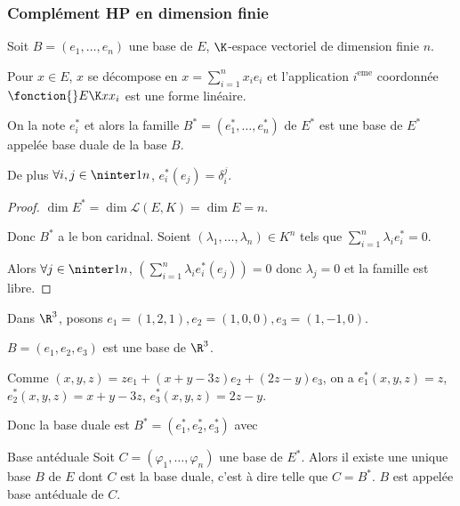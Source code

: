 \subsubsection{Complément HP en dimension finie}

\begin{definition}{}{}

    Soit $B = (e_1, \dots, e_n)$ une base de $E$, $\K$-espace vectoriel de dimension finie $n$. 

    Pour $x\in E$, $x$ se décompose en $x = \sum_{i=1}^n x_i e_i$ et l'application $i^{\text{eme}}$ coordonnée
    $\fonction{} E \K x {x_i}$ est une forme linéaire. 

    On la note $e_i^*$ et alors la famille $B^* = (e_1^*, \dots, e_n^*)$ de $E^*$ est une base de $E^*$
    appelée base duale de la base $B$.

    De plus $\forall i, j \in \ninter 1 n$, $e_i^*(e_j) = \delta_i^j$.
\end{definition}

\begin{proof}
    $\dim E^* = \dim \mathscr L (E, K) = \dim E = n$. 

    Donc $B^*$ a le bon caridnal. Soient $(\lambda_1, \dots, \lambda_n) \in K^n$ tels que
    $\sum_{i=1}^n \lambda_i e_i^* = 0$.

    Alors $\forall j \in \ninter 1 n$, $\left( \sum_{i=1}^n \lambda_i e_i^*(e_j) \right) = 0$ donc
    $\lambda_j = 0$ et la famille est libre. 
    
\end{proof}

\begin{exemple}
    Dans $\R^3$, posons $e_1 = (1, 2, 1), e_2 = (1, 0, 0) , e_3 = (1, -1, 0)$.

    $B = (e_1, e_2, e_3)$ est une base de $\R^3$.

    Comme $(x, y, z ) = z e_1 + (x + y - 3z) e_2 + (2z - y) e_3$, on a
    $e_1^*(x, y, z) = z$, $e_2^*(x, y, z) = x + y - 3z$, $e_3^*(x, y, z) = 2z - y$.

    Donc la base duale est $B^* = (e_1^*, e_2^*, e_3^*)$ avec
\end{exemple}

\begin{theoreme}{Base antéduale}{}
    Soit $C = (\varphi_1, \dots, \varphi_n)$ une base de $E^*$. Alors il existe une unique base $B$ de $E$ dont $C$
    est la base duale, c'est à dire telle que $C = B^*$. 
    $B$ est appelée base antéduale de $C$.
    
\end{theoreme}

